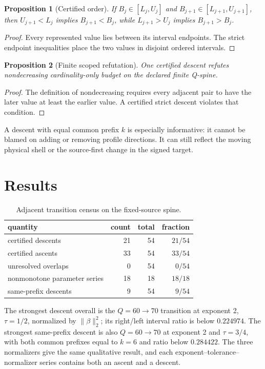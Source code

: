 \documentclass[11pt]{article}
\newtheorem{proposition}{Proposition}
\begin{document}
\begin{proposition}[Certified order]
If $B_j\in[L_j,U_j]$ and $B_{j+1}\in[L_{j+1},U_{j+1}]$, then
$U_{j+1}<L_j$ implies $B_{j+1}<B_j$, while $L_{j+1}>U_j$ implies
$B_{j+1}>B_j$.
\end{proposition}
\begin{proof}
Every represented value lies between its interval endpoints.  The strict
endpoint inequalities place the two values in disjoint ordered intervals.
\end{proof}

\begin{proposition}[Finite scoped refutation]
One certified descent refutes nondecreasing cardinality-only budget on the
declared finite Q-spine.
\end{proposition}
\begin{proof}
The definition of nondecreasing requires every adjacent pair to have the
later value at least the earlier value.  A certified strict descent violates
that condition.
\end{proof}

A descent with equal common prefix $k$ is especially informative: it cannot
be blamed on adding or removing profile directions.  It can still reflect the
moving physical shell or the source-first change in the signed target.

\section{Results}

\begin{table}[t]
\centering\small
\caption{Adjacent transition census on the fixed-source spine.}
\begin{tabular}{lrrr}
\toprule
quantity & count & total & fraction\\
\midrule
certified descents & 21 & 54 & $21/54$\\
certified ascents & 33 & 54 & $33/54$\\
unresolved overlaps & 0 & 54 & $0/54$\\
nonmonotone parameter series & 18 & 18 & $18/18$\\
same-prefix descents & 9 & 54 & $9/54$\\
\bottomrule
\end{tabular}
\end{table}

The strongest descent overall is the $Q=60\to70$ transition at exponent 2,
$\tau=1/2$, normalized by $\|\beta\|_2^2$; its right/left interval ratio is
below $0.224974$.  The strongest same-prefix descent is also $Q=60\to70$ at
exponent 2 and $\tau=3/4$, with both common prefixes equal to $k=6$ and ratio
below $0.284422$.  The three normalizers give the same qualitative result,
and each exponent--tolerance--normalizer series contains both an ascent and a
descent.
\end{document}
